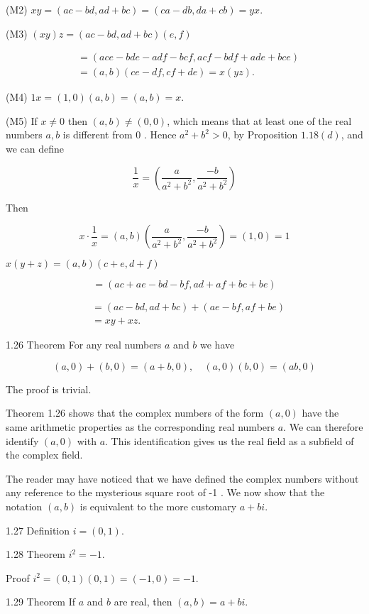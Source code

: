 \documentclass[10pt]{article}
\begin{document}
(M2) $x y=(a c-b d, a d+b c)=(c a-d b, d a+c b)=y x$.

(M3) $(x y) z=(a c-b d, a d+b c)(e, f)$

$$
\begin{aligned}
& =(a c e-b d e-a d f-b c f, a c f-b d f+a d e+b c e) \\
& =(a, b)(c e-d f, c f+d e)=x(y z) .
\end{aligned}
$$

(M4) $1 x=(1,0)(a, b)=(a, b)=x$.

(M5) If $x \neq 0$ then $(a, b) \neq(0,0)$, which means that at least one of the real numbers $a, b$ is different from 0 . Hence $a^{2}+b^{2}>0$, by Proposition $1.18(d)$, and we can define

$$
\frac{1}{x}=\left(\frac{a}{a^{2}+b^{2}}, \frac{-b}{a^{2}+b^{2}}\right)
$$

Then

$$
x \cdot \frac{1}{x}=(a, b)\left(\frac{a}{a^{2}+b^{2}}, \frac{-b}{a^{2}+b^{2}}\right)=(1,0)=1
$$

$x(y+z)=(a, b)(c+e, d+f)$

$$
=(a c+a e-b d-b f, a d+a f+b c+b e)
$$

$$
\begin{aligned}
& =(a c-b d, a d+b c)+(a e-b f, a f+b e) \\
& =x y+x z .
\end{aligned}
$$

1.26 Theorem For any real numbers $a$ and $b$ we have

$$
(a, 0)+(b, 0)=(a+b, 0), \quad(a, 0)(b, 0)=(a b, 0)
$$

The proof is trivial.

Theorem 1.26 shows that the complex numbers of the form $(a, 0)$ have the same arithmetic properties as the corresponding real numbers $a$. We can therefore identify $(a, 0)$ with $a$. This identification gives us the real field as a subfield of the complex field.

The reader may have noticed that we have defined the complex numbers without any reference to the mysterious square root of -1 . We now show that the notation $(a, b)$ is equivalent to the more customary $a+b i$.

1.27 Definition $i=(0,1)$.

1.28 Theorem $i^{2}=-1$.

Proof $i^{2}=(0,1)(0,1)=(-1,0)=-1$.

1.29 Theorem If $a$ and $b$ are real, then $(a, b)=a+b i$.
\end{document}
